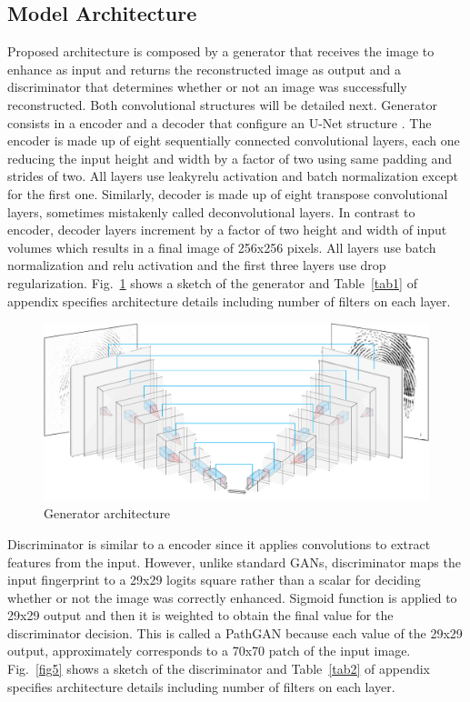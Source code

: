 \documentclass[a4paper,fleqn]{cas-dc}
\begin{document}
\subsection{Model Architecture}\label{sec:MA}
Proposed architecture is composed by a generator that receives the image to enhance as input and returns the reconstructed image as output and a discriminator that determines whether or not an image was successfully reconstructed. Both convolutional structures will be detailed next. Generator consists in a encoder and a decoder that configure an U-Net structure \cite{UNBIS}. The encoder is made up of eight sequentially connected convolutional layers, each one reducing the input height and width by a factor of two using same padding and strides of two. All layers use leakyrelu activation and batch normalization except for the first one. Similarly, decoder is made up of eight transpose convolutional layers, sometimes mistakenly called deconvolutional layers. In contrast to encoder, decoder layers increment by a factor of two height and width of input volumes which results in a final image of 256x256 pixels. All layers use batch normalization and relu activation and the first three layers use drop regularization. Fig.~\ref{fig4} shows a sketch of the generator and Table~\ref{tab1} of appendix specifies architecture details including number of filters on each layer.
\begin{figure}[htbp]
\centerline{\includegraphics[scale=0.36]{figs/generador_p.png}}
\caption{Generator architecture}
\label{fig4}
\end{figure}
Discriminator is similar to a encoder since it applies convolutions to extract features from the input. However, unlike standard GANs, discriminator maps the input fingerprint to a 29x29 logits square rather than a scalar for deciding whether or not the image was correctly enhanced. Sigmoid function is applied to 29x29 output and then it is weighted to obtain the final value for the discriminator decision. This is called a PathGAN because each value of the 29x29 output, approximately corresponds to a 70x70 patch of the input image. Fig.~\ref{fig5} shows a sketch of the discriminator and Table~\ref{tab2} of appendix specifies architecture details including number of filters on each layer.
\end{document}
